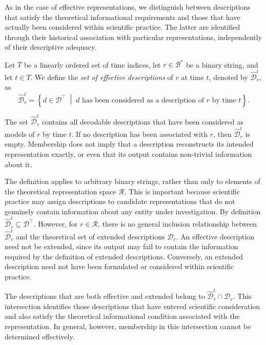 As in the case of effective representations, we distinguish between descriptions that satisfy the theoretical informational requirements and those that have actually been considered within scientific practice. The latter are identified through their historical association with particular representations, independently of their descriptive adequacy.

\begin{definition}
\label{def:effective_descriptions}
Let $T$ be a linearly ordered set of time indices, let $r\in\mathcal{B}^\ast$ be a binary string, and let $t\in T$. We define the \emph{set of effective descriptions} of $r$ at time $t$, denoted by $\hat{\mathcal{D}}_r^t$, as
\[
\hat{\mathcal{D}}_r^t = \left\{ d\in\mathcal{D}^\top \;\middle|\; d\text{ has been considered as a description of }r \text{ by time }t \right\}.
\]
\end{definition}

The set $\hat{\mathcal{D}}_r^t$ contains all decodable descriptions that have been considered as models of $r$ by time $t$. If no description has been associated with $r$, then $\hat{\mathcal{D}}_r^t$ is empty. Membership does not imply that a description reconstructs its intended representation exactly, or even that its output contains non-trivial information about it.

The definition applies to arbitrary binary strings, rather than only to elements of the theoretical representation space $\mathcal{R}$. This is important because scientific practice may assign descriptions to candidate representations that do not genuinely contain information about any entity under investigation. By definition $\hat{\mathcal{D}}_r^t\subseteq\mathcal{D}^\top$. However, for $r\in\mathcal{R}$, there is no general inclusion relationship between $\hat{\mathcal{D}}_r^t$ and the theoretical set of extended descriptions $\mathcal{D}_r$. An effective description need not be extended, since its output may fail to contain the information required by the definition of extended descriptions. Conversely, an extended description need not have been formulated or considered within scientific practice.

The descriptions that are both effective and extended belong to $\hat{\mathcal{D}}_r^t\cap\mathcal{D}_r$. This intersection identifies those descriptions that have entered scientific consideration and also satisfy the theoretical informational condition associated with the representation. In general, however, membership in this intersection cannot be determined effectively.

